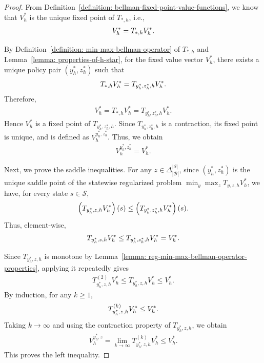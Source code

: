 \documentclass[10pt,a4paper]{amsart}
\def\cB{\mathcal B}
\def\cS{\mathcal S}
\begin{document}
\begin{proof}
    From Definition~\ref{definition: bellman-fixed-point-value-functions},
    we know that $V_h^*$ is the unique fixed point of $T_{*,h}$, i.e.,
    \begin{align}
        V_h^* = T_{*,h}V_h^* .\notag
    \end{align}

    By Definition~\ref{definition: min-max-bellman-operator} of $T_{*,h}$
    and Lemma~\ref{lemma: properties-of-h-star}, for the fixed value vector
    $V_h^*$, there exists a unique policy pair $(y_h^*,z_h^*)$ such that
    \begin{align}
        T_{*,h}V_h^*
        =
        T_{y_h^*,z_h^*,h}V_h^* .\notag
    \end{align}
    Therefore,
    \begin{align}
        V_h^*
        =
        T_{*,h}V_h^*
        =
        T_{y_h^*,z_h^*,h}V_h^* .
    \end{align}
    Hence $V_h^*$ is a fixed point of $T_{y_h^*,z_h^*,h}$. Since
    $T_{y_h^*,z_h^*,h}$ is a contraction, its fixed point is unique, and is defined as $V^{y_h^*,z_h^*}_h$. Thus, we obtain
    \begin{align}
        V_h^{y_h^*,z_h^*}
        =
        V_h^* .
    \end{align}

    Next, we prove the saddle inequalities. For any
    $z\in\Delta_{|\cB|}^{|\cS|}$, since $(y_h^*,z_h^*)$ is the unique
    saddle point of the statewise regularized problem $\min_{y} \max_{z} T_{y,z,h} V_h^*$,
    we have, for every state $s\in\cS$,
    \begin{align}
        \left(T_{y_h^*,z,h}V_h^*\right)(s)
        \le
        \left(T_{y_h^*,z_h^*,h}V_h^*\right)(s).\notag
    \end{align}
    Thus, element-wise,
    \begin{align}
        T_{y_h^*,z,h}V_h^*
        \le
        T_{y_h^*,z_h^*,h}V_h^*
        =
        V_h^* .\notag
    \end{align}

    Since $T_{y_h^*,z,h}$ is monotone by Lemma~\ref{lemma: reg-min-max-bellman-operator-properties}, applying it repeatedly gives
    \begin{align}
        T_{y_h^*,z,h}^{(2)}V_h^*
        \le
        T_{y_h^*,z,h}V_h^*
        \le
        V_h^* .
    \end{align}
    By induction, for any $k\ge 1$,
    \begin{align}
        T_{y_h^*,z,h}^{(k)}V_h^*
        \le
        V_h^* .\notag
    \end{align}
    Taking $k\to\infty$ and using the contraction property of
    $T_{y_h^*,z,h}$, we obtain
    \begin{align}
        V_h^{y_h^*,z}
        =
        \lim_{k\to\infty}
        T_{y_h^*,z,h}^{(k)}V_h^*
        \le
        V_h^* .
    \end{align}
    This proves the left inequality.


\end{proof}
\end{document}
